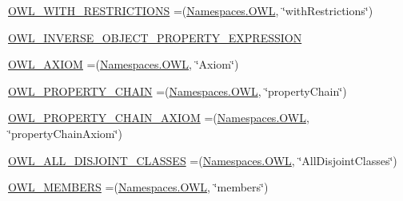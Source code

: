 \begin{DoxyCompactItemize}
\item 
\hyperlink{enumorg_1_1semanticweb_1_1owlapi_1_1vocab_1_1_o_w_l_r_d_f_vocabulary_a25926d4f58e39498597021f8bc038104}{O\-W\-L\-\_\-\-W\-I\-T\-H\-\_\-\-R\-E\-S\-T\-R\-I\-C\-T\-I\-O\-N\-S} =(\hyperlink{enumorg_1_1semanticweb_1_1owlapi_1_1vocab_1_1_namespaces_a2fcb537074d9307ef1356ffb6a5bd6f4}{Namespaces.\-O\-W\-L}, \char`\"{}with\-Restrictions\char`\"{})
\item 
\hyperlink{enumorg_1_1semanticweb_1_1owlapi_1_1vocab_1_1_o_w_l_r_d_f_vocabulary_a276640b742dc8c4b3eb24e0e1da82f28}{O\-W\-L\-\_\-\-I\-N\-V\-E\-R\-S\-E\-\_\-\-O\-B\-J\-E\-C\-T\-\_\-\-P\-R\-O\-P\-E\-R\-T\-Y\-\_\-\-E\-X\-P\-R\-E\-S\-S\-I\-O\-N}
\item 
\hyperlink{enumorg_1_1semanticweb_1_1owlapi_1_1vocab_1_1_o_w_l_r_d_f_vocabulary_a123e22ac905045f04fea4657e74c54df}{O\-W\-L\-\_\-\-A\-X\-I\-O\-M} =(\hyperlink{enumorg_1_1semanticweb_1_1owlapi_1_1vocab_1_1_namespaces_a2fcb537074d9307ef1356ffb6a5bd6f4}{Namespaces.\-O\-W\-L}, \char`\"{}Axiom\char`\"{})
\item 
\hyperlink{enumorg_1_1semanticweb_1_1owlapi_1_1vocab_1_1_o_w_l_r_d_f_vocabulary_a1022f8c5dbd5aa3254d4e03557007e17}{O\-W\-L\-\_\-\-P\-R\-O\-P\-E\-R\-T\-Y\-\_\-\-C\-H\-A\-I\-N} =(\hyperlink{enumorg_1_1semanticweb_1_1owlapi_1_1vocab_1_1_namespaces_a2fcb537074d9307ef1356ffb6a5bd6f4}{Namespaces.\-O\-W\-L}, \char`\"{}property\-Chain\char`\"{})
\item 
\hyperlink{enumorg_1_1semanticweb_1_1owlapi_1_1vocab_1_1_o_w_l_r_d_f_vocabulary_a742e3e9f24488014eb1241d695248f36}{O\-W\-L\-\_\-\-P\-R\-O\-P\-E\-R\-T\-Y\-\_\-\-C\-H\-A\-I\-N\-\_\-\-A\-X\-I\-O\-M} =(\hyperlink{enumorg_1_1semanticweb_1_1owlapi_1_1vocab_1_1_namespaces_a2fcb537074d9307ef1356ffb6a5bd6f4}{Namespaces.\-O\-W\-L}, \char`\"{}property\-Chain\-Axiom\char`\"{})
\item 
\hyperlink{enumorg_1_1semanticweb_1_1owlapi_1_1vocab_1_1_o_w_l_r_d_f_vocabulary_a7dba450e1741479d1463c4c361cc280b}{O\-W\-L\-\_\-\-A\-L\-L\-\_\-\-D\-I\-S\-J\-O\-I\-N\-T\-\_\-\-C\-L\-A\-S\-S\-E\-S} =(\hyperlink{enumorg_1_1semanticweb_1_1owlapi_1_1vocab_1_1_namespaces_a2fcb537074d9307ef1356ffb6a5bd6f4}{Namespaces.\-O\-W\-L}, \char`\"{}All\-Disjoint\-Classes\char`\"{})
\item 
\hyperlink{enumorg_1_1semanticweb_1_1owlapi_1_1vocab_1_1_o_w_l_r_d_f_vocabulary_a2be7f1803074903588f3b4911f0b1631}{O\-W\-L\-\_\-\-M\-E\-M\-B\-E\-R\-S} =(\hyperlink{enumorg_1_1semanticweb_1_1owlapi_1_1vocab_1_1_namespaces_a2fcb537074d9307ef1356ffb6a5bd6f4}{Namespaces.\-O\-W\-L}, \char`\"{}members\char`\"{})

\end{DoxyCompactItemize}

